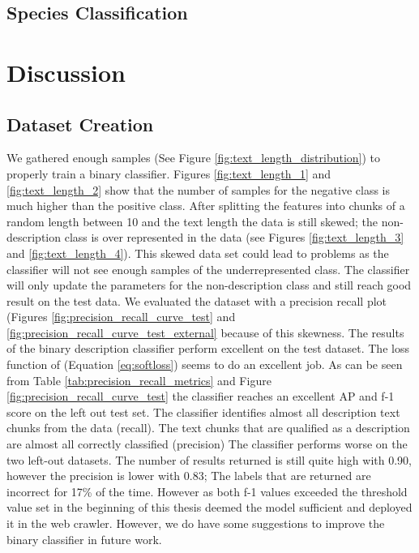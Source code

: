 \documentclass[a4paper, 12pt, oneside]{book} %
\begin{document}
\subsection{Species Classification}

\newpage
\section{Discussion} \label{par:discussion}

\subsection{Dataset Creation}
We gathered enough samples (See Figure \ref{fig:text_length_distribution}) to properly train a binary classifier.
Figures \ref{fig:text_length_1} and \ref{fig:text_length_2} show that the number of samples for the negative class is much higher than the positive class. 
After splitting the features into chunks of a random length between 10 and the text length the data is still skewed; the non-description class is over represented in the data (see Figures \ref{fig:text_length_3} and \ref{fig:text_length_4}). 
This skewed data set could lead to problems as the classifier will not see enough samples of the underrepresented class. 
The classifier will only update the parameters for the non-description class and still reach good result on the test data.
We evaluated the dataset with a precision recall plot (Figures \ref{fig:precision_recall_curve_test} and \ref{fig:precision_recall_curve_test_external} because of this skewness.
The results of the binary description classifier perform excellent on the test dataset. 
The loss function of \textcite{reed_training_2015} (Equation \ref{eq:softloss}) seems to do an excellent job.
As can be seen from Table \ref{tab:precision_recall_metrics} and Figure \ref{fig:precision_recall_curve_test} the classifier reaches an excellent AP and f-1 score on the left out test set.
The classifier identifies almost all description text chunks from the data (recall).
The text chunks that are qualified as a description are almost all correctly classified (precision)
The classifier performs worse on the two left-out datasets.
The number of results returned is still quite high with 0.90, however the precision is lower with 0.83; The labels that are returned are incorrect for 17\% of the time.
However as both f-1 values exceeded the threshold value set in the beginning of this thesis deemed the model sufficient and deployed it in the web crawler.
However, we do have some suggestions to improve the binary classifier in future work.
\end{document}
